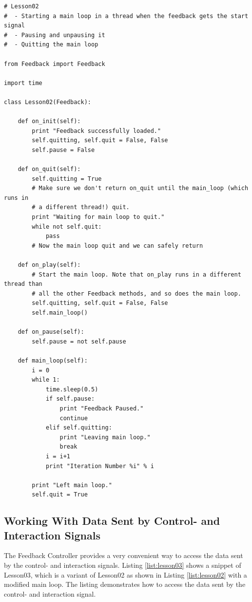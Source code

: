 \begin{lstlisting}[caption=A more realistic example., label={list:lesson02}]
# Lesson02 
#  - Starting a main loop in a thread when the feedback gets the start signal
#  - Pausing and unpausing it
#  - Quitting the main loop

from Feedback import Feedback

import time

class Lesson02(Feedback):
    
    def on_init(self):
        print "Feedback successfully loaded."
        self.quitting, self.quit = False, False
        self.pause = False
    
    def on_quit(self):
        self.quitting = True
        # Make sure we don't return on_quit until the main_loop (which runs in
        # a different thread!) quit.
        print "Waiting for main loop to quit."
        while not self.quit:
            pass
        # Now the main loop quit and we can safely return

    def on_play(self):
        # Start the main loop. Note that on_play runs in a different thread than
        # all the other Feedback methods, and so does the main loop.
        self.quitting, self.quit = False, False
        self.main_loop()
        
    def on_pause(self):
        self.pause = not self.pause
        
    def main_loop(self):
        i = 0
        while 1:
            time.sleep(0.5)
            if self.pause:
                print "Feedback Paused."
                continue
            elif self.quitting:
                print "Leaving main loop."
                break
            i = i+1
            print "Iteration Number %i" % i
        
        print "Left main loop."
        self.quit = True
\end{lstlisting}

\subsection{Working With Data Sent by Control- and Interaction Signals}
\label{sec:working-with-cs-is}
The Feedback Controller provides a very convenient way to access the data sent by the control- and interaction signals. Listing \ref{list:lesson03} shows a snippet of Lesson03, which is a variant of Lesson02 as shown in Listing \ref{list:lesson02} with a modified main loop. The listing demonstrates how to access the data sent by the control- and interaction signal.

